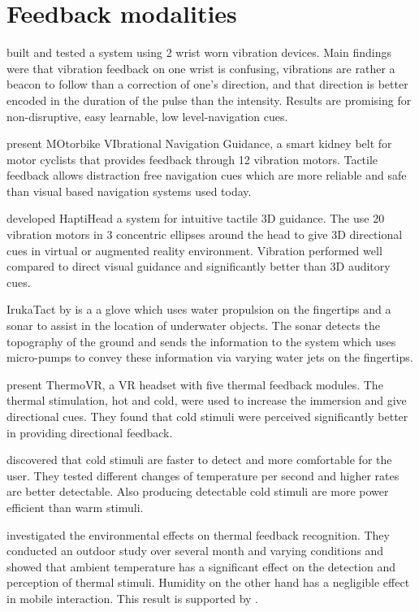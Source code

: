 \section{Feedback modalities}

\cite{bosman} built and tested a system using 2 wrist worn vibration devices.
Main findings were that vibration feedback on one wrist is confusing, vibrations are rather a beacon to follow than a correction of one's direction, and that direction is better encoded in the duration of the pulse than the intensity.
Results are promising for non-disruptive, easy learnable, low level-navigation cues.

\cite{Kiss:2018:NSM:3173574.3174191} present MOtorbike VIbrational Navigation Guidance, a smart kidney belt for motor cyclists that provides feedback through 12 vibration motors.
Tactile feedback allows distraction free navigation cues which are more reliable and safe than visual based navigation systems used today.

\cite{Kaul_HapticHead} developed HaptiHead a system for intuitive tactile 3D guidance.
The use 20 vibration motors in 3 concentric ellipses around the head to give 3D directional cues in virtual or augmented reality environment.
Vibration performed well compared to direct visual guidance and significantly better than 3D auditory cues.

IrukaTact by \cite{Chacin_Irukatact} is a a glove which uses water propulsion on the fingertips and a sonar to assist in the location of underwater objects. The sonar detects the topography of the ground and sends the information to the system which uses micro-pumps to convey these information via varying water jets on the fingertips.

\cite{Peiris_thermoVR} present ThermoVR, a VR headset with five thermal feedback modules. 
The thermal stimulation, hot and cold, were used to increase the immersion and give directional cues.
They found that cold stimuli were perceived significantly better in providing directional feedback.

\cite{Wilson:2011:LHT:1978942.1979316} discovered that cold stimuli are faster to detect and more comfortable for the user. 
They tested different changes of temperature per second and higher rates are better detectable. 
Also producing detectable cold stimuli are more power efficient than warm stimuli.

\cite{Halvey:2012:BCO:2207676.2207779} investigated the environmental effects on thermal feedback recognition. 
They conducted an outdoor study over several month and varying conditions and showed that ambient temperature has a significant effect on the detection and perception of thermal stimuli.
Humidity on the other hand has a negligible effect in mobile interaction. 
This result is supported by \cite{givoni}.

